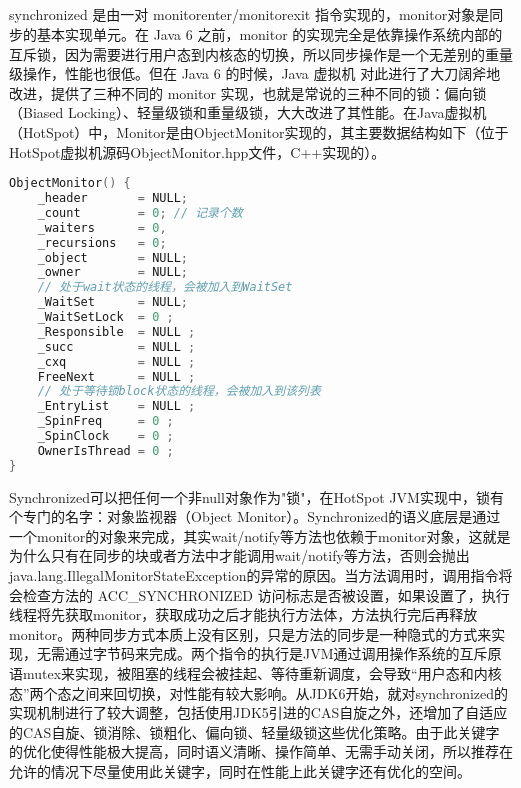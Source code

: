 \documentclass[../../../interview-questions.tex]{subfiles}
\begin{document}
\subsection{\color{red}{synchronized的实现原理是什么}}

synchronized 是由一对 monitorenter/monitorexit 指令实现的，monitor对象是同步的基本实现单元。在 Java 6 之前，monitor 的实现完全是依靠操作系统内部的互斥锁，因为需要进行用户态到内核态的切换，所以同步操作是一个无差别的重量级操作，性能也很低。但在 Java 6 的时候，Java 虚拟机 对此进行了大刀阔斧地改进，提供了三种不同的 monitor 实现，也就是常说的三种不同的锁：偏向锁（Biased Locking）、轻量级锁和重量级锁，大大改进了其性能。在Java虚拟机（HotSpot）中，Monitor是由ObjectMonitor实现的，其主要数据结构如下（位于HotSpot虚拟机源码ObjectMonitor.hpp文件，C++实现的）。

\begin{lstlisting}[language=C++]
ObjectMonitor() {
    _header       = NULL;
    _count        = 0; // 记录个数
    _waiters      = 0,
    _recursions   = 0;
    _object       = NULL;
    _owner        = NULL;
    // 处于wait状态的线程，会被加入到WaitSet
    _WaitSet      = NULL; 
    _WaitSetLock  = 0 ;
    _Responsible  = NULL ;
    _succ         = NULL ;
    _cxq          = NULL ;
    FreeNext      = NULL ;
    // 处于等待锁block状态的线程，会被加入到该列表
    _EntryList    = NULL ; 
    _SpinFreq     = 0 ;
    _SpinClock    = 0 ;
    OwnerIsThread = 0 ;
}
\end{lstlisting}

Synchronized可以把任何一个非null对象作为"锁"，在HotSpot JVM实现中，锁有个专门的名字：对象监视器（Object Monitor）。Synchronized的语义底层是通过一个monitor的对象来完成，其实wait/notify等方法也依赖于monitor对象，这就是为什么只有在同步的块或者方法中才能调用wait/notify等方法，否则会抛出java.lang.IllegalMonitorStateException的异常的原因。当方法调用时，调用指令将会检查方法的 ACC\_SYNCHRONIZED 访问标志是否被设置，如果设置了，执行线程将先获取monitor，获取成功之后才能执行方法体，方法执行完后再释放monitor。两种同步方式本质上没有区别，只是方法的同步是一种隐式的方式来实现，无需通过字节码来完成。两个指令的执行是JVM通过调用操作系统的互斥原语mutex来实现，被阻塞的线程会被挂起、等待重新调度，会导致“用户态和内核态”两个态之间来回切换，对性能有较大影响。从JDK6开始，就对synchronized的实现机制进行了较大调整，包括使用JDK5引进的CAS自旋之外，还增加了自适应的CAS自旋、锁消除、锁粗化、偏向锁、轻量级锁这些优化策略。由于此关键字的优化使得性能极大提高，同时语义清晰、操作简单、无需手动关闭，所以推荐在允许的情况下尽量使用此关键字，同时在性能上此关键字还有优化的空间。
\end{document}
